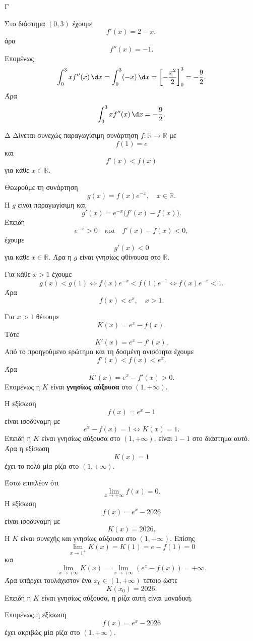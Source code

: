 \begin{thema}{Γ}
\begin{erwthma}
\item Στο διάστημα $(0,3)$ έχουμε
\[
f'(x)=2-x,
\]
άρα
\[
f''(x)=-1.
\]
Επομένως
\[
\dint_0^3 x f''(x)\,\d x
=\dint_0^3 (-x)\,\d x
=\left[-\frac{x^2}{2}\right]_0^3
=-\frac{9}{2}.
\]
Άρα
\[
{\dint_0^3 x f''(x)\,\d x=-\frac{9}{2}}.
\]
\end{erwthma}
\end{thema}

\begin{thema}{Δ}
Δίνεται συνεχώς παραγωγίσιμη συνάρτηση $f:\mathbb{R}\to\mathbb{R}$ με
\[
f(1)=e
\]
και
\[
f'(x)<f(x)
\]
για κάθε $x\in\mathbb{R}$.
\begin{erwthma}
\item Θεωρούμε τη συνάρτηση
\[
g(x)=f(x)e^{-x},\quad x\in\mathbb{R}.
\]
Η $g$ είναι παραγωγίσιμη και
\[
g'(x)=e^{-x}\bigl(f'(x)-f(x)\bigr).
\]
Επειδή
\[
e^{-x}>0
\quad\text{και}\quad
f'(x)-f(x)<0,
\]
έχουμε
\[
g'(x)<0
\]
για κάθε $x\in\mathbb{R}$. Άρα η $g$ είναι γνησίως φθίνουσα στο $\mathbb{R}$.

Για κάθε $x>1$ έχουμε
\[
g(x)<g(1)
\Leftrightarrow f(x)e^{-x}<f(1)e^{-1}
\Leftrightarrow f(x)e^{-x}<1.
\]
Άρα
\[
{f(x)<e^x,\quad x>1}.
\]

\item Για $x>1$ θέτουμε
\[
K(x)=e^x-f(x).
\]
Τότε
\[
K'(x)=e^x-f'(x).
\]
Από το προηγούμενο ερώτημα και τη δοσμένη ανισότητα έχουμε
\[
f'(x)<f(x)<e^x.
\]
Άρα
\[
K'(x)=e^x-f'(x)>0.
\]
Επομένως η $K$ είναι \textbf{γνησίως αύξουσα} στο $(1,+\infty)$.

\item Η εξίσωση
\[
f(x)=e^x-1
\]
είναι ισοδύναμη με
\[
e^x-f(x)=1
\Leftrightarrow K(x)=1.
\]
Επειδή η $K$ είναι γνησίως αύξουσα στο $(1,+\infty)$, είναι $1-1$ στο διάστημα αυτό. Άρα η εξίσωση
\[
K(x)=1
\]
έχει το πολύ μία ρίζα στο $(1,+\infty)$.

\item Έστω επιπλέον ότι
\[
\lim_{x\to+\infty}f(x)=0.
\]
Η εξίσωση
\[
f(x)=e^x-2026
\]
είναι ισοδύναμη με
\[
K(x)=2026.
\]
Η $K$ είναι συνεχής και γνησίως αύξουσα στο $(1,+\infty)$. Επίσης
\[
\lim_{x\to1^+}K(x)=K(1)=e-f(1)=0
\]
και
\[
\lim_{x\to+\infty}K(x)=\lim_{x\to+\infty}(e^x-f(x))=+\infty.
\]
Άρα υπάρχει τουλάχιστον ένα $x_0\in(1,+\infty)$ τέτοιο ώστε
\[
K(x_0)=2026.
\]
Επειδή η $K$ είναι γνησίως αύξουσα, η ρίζα αυτή είναι μοναδική.

Επομένως η εξίσωση
\[
f(x)=e^x-2026
\]
έχει ακριβώς μία ρίζα στο $(1,+\infty)$.
\end{erwthma}
\end{thema}
